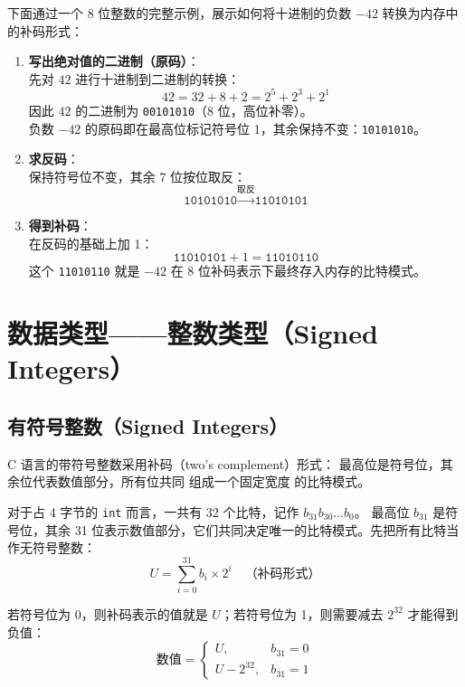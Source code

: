 下面通过一个 8 位整数的完整示例，展示如何将十进制的负数 $-42$ 转换为内存中的补码形式：

\begin{enumerate}[label=\ding{\numexpr171+\arabic*}]
    \item \textbf{写出绝对值的二进制（原码）}：\\
    先对 $42$ 进行十进制到二进制的转换：
    \[
    42 = 32 + 8 + 2 = 2^5 + 2^3 + 2^1
    \]
    因此 $42$ 的二进制为 \texttt{00101010}（8 位，高位补零）。\\
    负数 $-42$ 的原码即在最高位标记符号位 1，其余保持不变：\texttt{10101010}。
    
    \item \textbf{求反码}：\\
    保持符号位不变，其余 7 位按位取反：
    \[
    \texttt{10101010} \xrightarrow{\text{取反}} \texttt{11010101}
    \]
    
    \item \textbf{得到补码}：\\
    在反码的基础上加 1：
    \[
    \texttt{11010101} + 1 = \texttt{11010110}
    \]
    这个 \texttt{11010110} 就是 $-42$ 在 8 位补码表示下最终存入内存的比特模式。
\end{enumerate}
\newpage



\section{数据类型——整数类型（Signed Integers）}
\subsection{有符号整数（Signed Integers）}

C 语言的带符号整数采用补码（two's complement）形式：
最高位是符号位，其余位代表数值部分，所有位共同
组成一个固定宽度
的比特模式。

对于占 4 字节的 \texttt{int} 而言，一共有 32 个比特，记作 $b_{31} b_{30} \ldots b_0$。
最高位 $b_{31}$ 是符号位，其余 31 位表示数值部分，它们共同决定唯一的比特模式。先把所有比特当作无符号整数：
\[
U = \sum_{i=0}^{31} b_i \times 2^i \quad \text{（补码形式）}
\]

若符号位为 0，则补码表示的值就是 $U$；若符号位为 1，则需要减去 $2^{32}$ 才能得到负值：
\[
\text{数值} =
\begin{cases}
U, & b_{31} = 0 \\
U - 2^{32}, & b_{31} = 1
\end{cases}
\]

